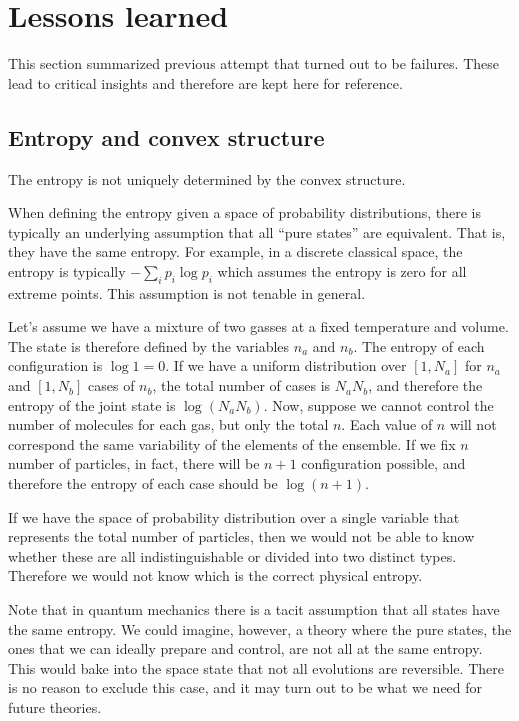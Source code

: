 \section{Lessons learned}

This section summarized previous attempt that turned out to be failures. These lead to critical insights and therefore are kept here for reference.

\subsection{Entropy and convex structure}

\begin{insight}
	The entropy is not uniquely determined by the convex structure.
\end{insight}

When defining the entropy given a space of probability distributions, there is typically an underlying assumption that all ``pure states'' are equivalent. That is, they have the same entropy. For example, in a discrete classical space, the entropy is typically $-\sum_i p_i \log p_i$ which assumes the entropy is zero for all extreme points. This assumption is not tenable in general.

\begin{example}
	Let's assume we have a mixture of two gasses at a fixed temperature and volume. The state is therefore defined by the variables $n_a$ and $n_b$. The entropy of each configuration is $\log 1 = 0$. If we have a uniform distribution over $[1,N_a]$ for $n_a$ and $[1,N_b]$ cases of $n_b$, the total number of cases is $N_a N_b$, and therefore the entropy of the joint state is $\log (N_a N_b)$. Now, suppose we cannot control the number of molecules for each gas, but only the total $n$. Each value of $n$ will not correspond the same variability of the elements of the ensemble. If we fix $n$ number of particles, in fact, there will be $n+1$ configuration possible, and therefore the entropy of each case should be $\log (n+1)$.
	
	If we have the space of probability distribution over a single variable that represents the total number of particles, then we would not be able to know whether these are all indistinguishable or divided into two distinct types. Therefore we would not know which is the correct physical entropy.
\end{example}

Note that in quantum mechanics there is a tacit assumption that all states have the same entropy. We could imagine, however, a theory where the pure states, the ones that we can ideally prepare and control, are not all at the same entropy. This would bake into the space state that not all evolutions are reversible. There is no reason to exclude this case, and it may turn out to be what we need for future theories.


